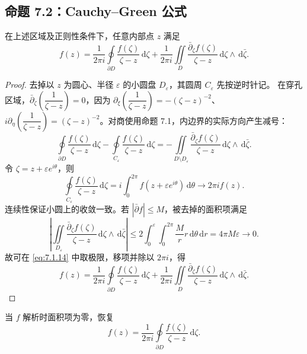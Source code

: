\documentclass[lang=cn,scheme=chinese,mode=simple,device=normal,color=blue,math=cm,thmcnt=section,12pt]{elegantbook}
\newcommand{\dd}{\,\mathrm{d}}
\newcommand{\eqq}[2]{\tag{#1}\label{eq:#1}#2}
\begin{document}
\subsection{命题 7.2：Cauchy--Green 公式}
\begin{proposition}
在上述区域及正则性条件下，任意内部点 $z$ 满足
\begin{equation}
\eqq{7.1.13}{f(z)=\dfrac{1}{2\pi i}\oint\limits_{\partial D}\dfrac{f(\zeta)}{\zeta-z}\dd\zeta
+\dfrac{1}{2\pi i}\iint\limits_D\dfrac{\bar\partial_\zeta f(\zeta)}{\zeta-z}\dd\zeta\wedge\dd\bar\zeta.}
\end{equation}
\end{proposition}
\begin{proof}
去掉以 $z$ 为圆心、半径 $\varepsilon$ 的小圆盘 $D_\varepsilon$，其圆周 $C_\varepsilon$ 先按逆时针记。
在穿孔区域，$\bar\partial_\zeta(\dfrac{1}{\zeta-z})=0$，因为
$\partial_\xi(\dfrac{1}{\zeta-z})=-(\zeta-z)^{-2}$、
$i\partial_\eta(\dfrac{1}{\zeta-z})=(\zeta-z)^{-2}$。对商使用命题 7.1，内边界的实际方向产生减号：
\begin{equation}
\eqq{7.1.14}{\oint\limits_{\partial D}\dfrac{f(\zeta)}{\zeta-z}\dd\zeta
-\oint\limits_{C_\varepsilon}\dfrac{f(\zeta)}{\zeta-z}\dd\zeta
=-\iint\limits_{D\setminus D_\varepsilon}\dfrac{\bar\partial_\zeta f(\zeta)}{\zeta-z}\dd\zeta\wedge\dd\bar\zeta.}
\end{equation}
令 $\zeta=z+\varepsilon e^{i\theta}$，则
\begin{equation}
\eqq{7.1.15}{\oint\limits_{C_\varepsilon}\dfrac{f(\zeta)}{\zeta-z}\dd\zeta
=i\int_0^{2\pi}f(z+\varepsilon e^{i\theta})\dd\theta\longrightarrow2\pi if(z).}
\end{equation}
连续性保证小圆上的收敛一致。若 $|\bar\partial f|\le M$，被去掉的面积项满足
\begin{equation}
\eqq{7.1.16}{\left|\iint\limits_{D_\varepsilon}\dfrac{\bar\partial_\zeta f(\zeta)}{\zeta-z}\dd\zeta\wedge\dd\bar\zeta\right|
\le2\int_0^\varepsilon\int_0^{2\pi}\dfrac{M}{r}r\dd\theta\dd r=4\pi M\varepsilon\longrightarrow0.}
\end{equation}
故可在 \eqref{eq:7.1.14} 中取极限，移项并除以 $2\pi i$，得
\begin{equation}
\eqq{7.1.17}{f(z)=\dfrac{1}{2\pi i}\oint\limits_{\partial D}\dfrac{f(\zeta)}{\zeta-z}\dd\zeta
+\dfrac{1}{2\pi i}\iint\limits_D\dfrac{\bar\partial_\zeta f(\zeta)}{\zeta-z}\dd\zeta\wedge\dd\bar\zeta.}
\end{equation}
\end{proof}
当 $f$ 解析时面积项为零，恢复
\begin{equation}
\eqq{7.1.18}{f(z)=\dfrac{1}{2\pi i}\oint\limits_{\partial D}\dfrac{f(\zeta)}{\zeta-z}\dd\zeta.}
\end{equation}
\end{document}
